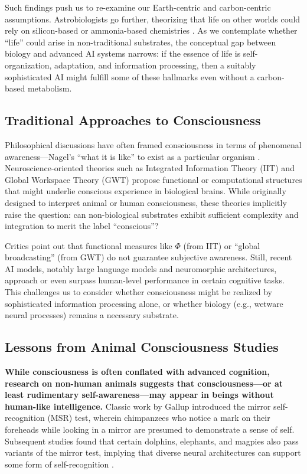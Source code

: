 \documentclass[12pt]{article}
\begin{document}
Such findings push us to re-examine our Earth-centric and carbon-centric assumptions. Astrobiologists go further, theorizing that life on other worlds could rely on silicon-based or ammonia-based chemistries \cite{Davies2010}. As we contemplate whether “life” could arise in non-traditional substrates, the conceptual gap between biology and advanced AI systems narrows: if the essence of life is self-organization, adaptation, and information processing, then a suitably sophisticated AI might fulfill some of these hallmarks even without a carbon-based metabolism.

\subsection*{Traditional Approaches to Consciousness}

Philosophical discussions have often framed consciousness in terms of phenomenal awareness—Nagel’s “what it is like” to exist as a particular organism \cite{Nagel1974}. Neuroscience-oriented theories such as Integrated Information Theory (IIT) \cite{Tononi2004} and Global Workspace Theory (GWT) \cite{Baars1988} propose functional or computational structures that might underlie conscious experience in biological brains. While originally designed to interpret animal or human consciousness, these theories implicitly raise the question: can non-biological substrates exhibit sufficient complexity and integration to merit the label “conscious”?

Critics point out that functional measures like $\Phi$ (from IIT) or “global broadcasting” (from GWT) do not guarantee subjective awareness. Still, recent AI models, notably large language models and neuromorphic architectures, approach or even surpass human-level performance in certain cognitive tasks. This challenges us to consider whether consciousness might be realized by sophisticated information processing alone, or whether biology (e.g., wetware neural processes) remains a necessary substrate.

\subsection*{\textbf{Lessons from Animal Consciousness Studies}}
\label{subsec:animal_consciousness}

\textbf{While consciousness is often conflated with advanced cognition, research on non-human animals suggests that consciousness—or at least rudimentary self-awareness—may appear in beings without human-like intelligence.} Classic work by Gallup \cite{Gallup1970} introduced the mirror self-recognition (MSR) test, wherein chimpanzees who notice a mark on their foreheads while looking in a mirror are presumed to demonstrate a sense of self. Subsequent studies found that certain dolphins, elephants, and magpies also pass variants of the mirror test, implying that diverse neural architectures can support some form of self-recognition \cite{Bekoff2002, Plotnik2006}.
\end{document}

